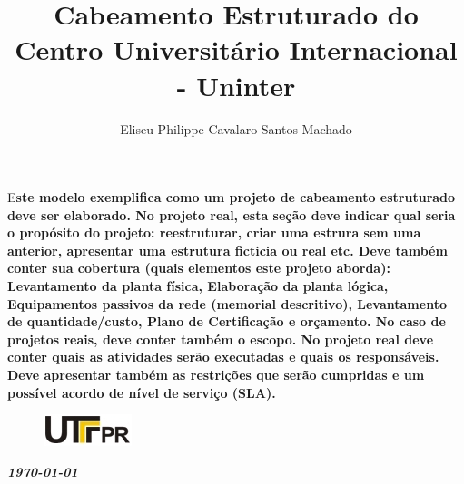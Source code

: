 \documentclass[	DIV=calc,%
							paper=a4,%
							fontsize=12pt,%
							onecolumn]{scrartcl}	 					%
\title{Cabeamento Estruturado do Centro Universitário Internacional - Uninter}					%
\author{Eliseu Philippe Cavalaro Santos Machado}  	%
\date{}																				%
\newcommand{\initial}[1]{%
     \lettrine[lines=3,lhang=0.3,nindent=0em]{
     				\color{DarkGoldenrod}
     				{\textsf{#1}}}{}}
\begin{document}
\maketitle
\thispagestyle{fancy} 	
\thispagestyle{empty}		%




\initial{E}\textbf{ste modelo exemplifica como um projeto de cabeamento estruturado deve ser elaborado. No projeto real,
	esta seção deve indicar qual seria o propósito do projeto: reestruturar, criar uma estrura sem uma anterior, apresentar uma estrutura ficticia ou real  etc. Deve também conter sua cobertura (quais elementos este projeto aborda): Levantamento da planta física, Elaboração da planta lógica, Equipamentos passivos da rede (memorial descritivo), Levantamento de quantidade/custo, Plano de Certificação e orçamento.
	No caso de projetos reais, deve conter também o escopo. No projeto real deve conter quais as atividades serão executadas e quais os responsáveis. Deve apresentar também as restrições que serão cumpridas e um possível acordo de nível de serviço (SLA).}

\begin{figure}
	\centering
	\includegraphics{utfpr}
\end{figure}

\vspace{3cm}
\centerline{\textit{\textbf{\today}}}

\clearpage
    \renewcommand*\listfigurename{Lista de figuras}
\listoffigures

\renewcommand*\listtablename{Lista de tabelas}
\listoftables




\clearpage
\renewcommand{\contentsname}{Sumário}
\tableofcontents
\clearpage

\end{document}
